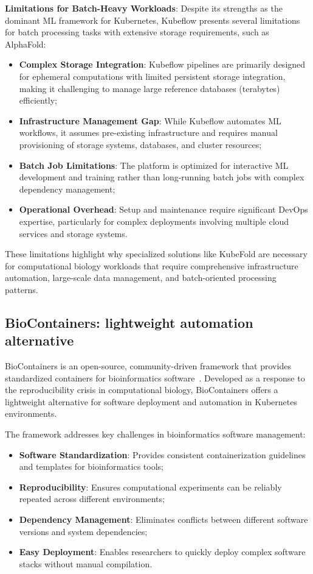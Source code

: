 \textbf{Limitations for Batch-Heavy Workloads}: Despite its strengths as the dominant ML framework for Kubernetes, Kubeflow presents several limitations for batch processing tasks with extensive storage requirements, such as AlphaFold:

\begin{itemize}
    \item \textbf{Complex Storage Integration}: Kubeflow pipelines are primarily designed for ephemeral computations with limited persistent storage integration, making it challenging to manage large reference databases (terabytes) efficiently;
    \item \textbf{Infrastructure Management Gap}: While Kubeflow automates ML workflows, it assumes pre-existing infrastructure and requires manual provisioning of storage systems, databases, and cluster resources;
    \item \textbf{Batch Job Limitations}: The platform is optimized for interactive ML development and training rather than long-running batch jobs with complex dependency management;
    \item \textbf{Operational Overhead}: Setup and maintenance require significant DevOps expertise, particularly for complex deployments involving multiple cloud services and storage systems.
\end{itemize}

These limitations highlight why specialized solutions like KubeFold are necessary for computational biology workloads that require comprehensive infrastructure automation, large-scale data management, and batch-oriented processing patterns.

\subsection{BioContainers: lightweight automation alternative}

BioContainers is an open-source, community-driven framework that provides standardized containers for bioinformatics software~\cite{biocontainers}.
Developed as a response to the reproducibility crisis in computational biology, BioContainers offers a lightweight alternative for software deployment and automation in Kubernetes environments.

The framework addresses key challenges in bioinformatics software management:
\begin{itemize}
    \item \textbf{Software Standardization}: Provides consistent containerization guidelines and templates for bioinformatics tools;
    \item \textbf{Reproducibility}: Ensures computational experiments can be reliably repeated across different environments;
    \item \textbf{Dependency Management}: Eliminates conflicts between different software versions and system dependencies;
    \item \textbf{Easy Deployment}: Enables researchers to quickly deploy complex software stacks without manual compilation.
\end{itemize}

